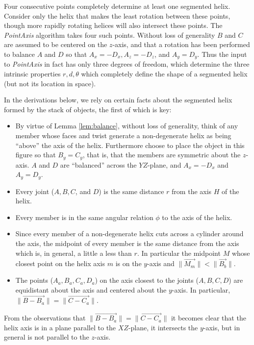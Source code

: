 \documentclass{svproc}
\begin{document}
Four consecutive points completely determine at least one segmented helix.
Consider
only the helix that makes the least rotation between these points,
though more rapidly rotating helices will also intersect these points.
The {\em PointAxis} algorithm
takes four such points. Without loss of generality $B$ and $C$
are assumed to be centered on the $z$-axis, and that a
rotation has been performed to balance $A$ and $D$ so that $A_x = -D_x, A_z = -D_z$, and $A_y = D_y$. Thus the input to
{\em PointAxis} in fact has only three degrees of freedom, which determine the three intrinsic properties $r,d,\theta$
which completely define the shape of a segmented helix (but not its location in space).


In the derivations below, we rely on certain facts about
the segmented helix formed by the stack of objects, the first
of which is key:
\begin{itemize}
\item By virtue of Lemma \ref{lem:balance}, without loss of generality, think of any member whose faces
  and twist generate a non-degenerate helix as being ``above'' the
  axis of the helix. Furthermore choose to place the object in
  this figure so that $B_y = C_y$, that is, that the members are symmetric
  about the $z$-axis.
  $A$ and $D$ are ``balanced'' across the $YZ$-plane,
  and $A_x = -D_x$ and $A_y = D_y$.
\item Every joint ($A,B,C$, and $D$) is the same distance $r$ from the axis $H$ of the helix.
\item Every member is in the same angular relation $\phi$ to the axis of the helix.
\item Since every member of a non-degenerate helix cuts across a cylinder around the axis,
  the midpoint of every member is the same distance from the axis
  which is, in general, a little a less than $r$. In particular the midpoint $M$
  whose closest point on the helix axis $m$ is on the $y$-axis and
  $\| \overrightarrow{M_m} \| < \| \overrightarrow{B_b} \|$.
\item The points ($A_a,B_a,C_a,D_a$) on the axis closest to the joints ($A,B,C,D$)
  are equidistant about the axis and centered about the $y$-axis. In
  particular, $\| \overrightarrow{B - B_a} \| = \| \overrightarrow{C - C_a} \|$.
\end{itemize}

From the observations that $\| \overrightarrow{B - B_a} \| = \| \overrightarrow{C - C_a} \|$
it becomes clear that the helix axis is in a plane
parallel to the $XZ$-plane, it intersects the $y$-axis, but in general is
not parallel to the $z$-axis.
\end{document}
